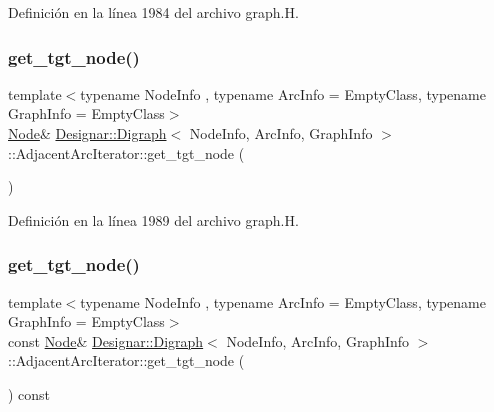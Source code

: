Definición en la línea 1984 del archivo graph.\+H.

\mbox{\label{class_designar_1_1_digraph_1_1_adjacent_arc_iterator_ad1df4c6624e411ea5ec10ee3d1414b1c}} 
\subsubsection{\texorpdfstring{get\+\_\+tgt\+\_\+node()}{get\_tgt\_node()}\hspace{0.1cm}{\footnotesize\ttfamily [1/2]}}
{\footnotesize\ttfamily template$<$typename Node\+Info , typename Arc\+Info  = Empty\+Class, typename Graph\+Info  = Empty\+Class$>$ \\
\hyperlink{class_designar_1_1_digraph_a4dc921c41a480b7946a04170e997d8ae}{Node}\& \hyperlink{class_designar_1_1_digraph}{Designar\+::\+Digraph}$<$ Node\+Info, Arc\+Info, Graph\+Info $>$\+::Adjacent\+Arc\+Iterator\+::get\+\_\+tgt\+\_\+node (\begin{DoxyParamCaption}{ }\end{DoxyParamCaption})\hspace{0.3cm}{\ttfamily [inline]}}



Definición en la línea 1989 del archivo graph.\+H.

\mbox{\label{class_designar_1_1_digraph_1_1_adjacent_arc_iterator_a3b5e320227b6456e9b0de9d505e0eae4}} 
\subsubsection{\texorpdfstring{get\+\_\+tgt\+\_\+node()}{get\_tgt\_node()}\hspace{0.1cm}{\footnotesize\ttfamily [2/2]}}
{\footnotesize\ttfamily template$<$typename Node\+Info , typename Arc\+Info  = Empty\+Class, typename Graph\+Info  = Empty\+Class$>$ \\
const \hyperlink{class_designar_1_1_digraph_a4dc921c41a480b7946a04170e997d8ae}{Node}\& \hyperlink{class_designar_1_1_digraph}{Designar\+::\+Digraph}$<$ Node\+Info, Arc\+Info, Graph\+Info $>$\+::Adjacent\+Arc\+Iterator\+::get\+\_\+tgt\+\_\+node (\begin{DoxyParamCaption}{ }\end{DoxyParamCaption}) const\hspace{0.3cm}{\ttfamily [inline]}}



